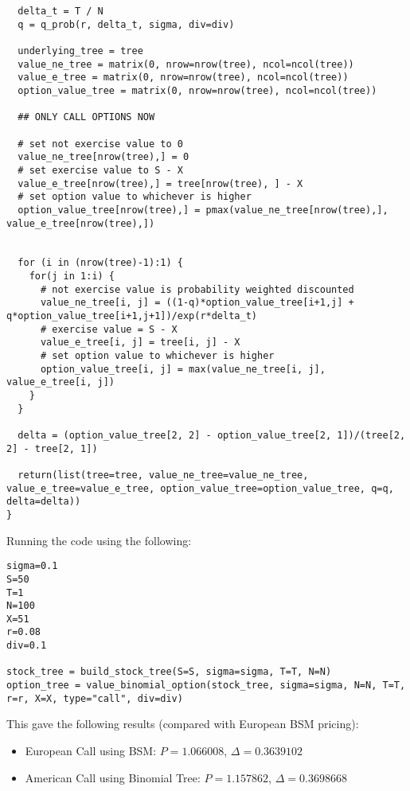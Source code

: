 \documentclass[11pt]{scrartcl}
\begin{document}
\begin{lstlisting}
  delta_t = T / N
  q = q_prob(r, delta_t, sigma, div=div)
  
  underlying_tree = tree
  value_ne_tree = matrix(0, nrow=nrow(tree), ncol=ncol(tree))
  value_e_tree = matrix(0, nrow=nrow(tree), ncol=ncol(tree))
  option_value_tree = matrix(0, nrow=nrow(tree), ncol=ncol(tree))
  
  ## ONLY CALL OPTIONS NOW
  
  # set not exercise value to 0
  value_ne_tree[nrow(tree),] = 0
  # set exercise value to S - X
  value_e_tree[nrow(tree),] = tree[nrow(tree), ] - X
  # set option value to whichever is higher
  option_value_tree[nrow(tree),] = pmax(value_ne_tree[nrow(tree),], value_e_tree[nrow(tree),])
  
  
  for (i in (nrow(tree)-1):1) {
    for(j in 1:i) {
      # not exercise value is probability weighted discounted
      value_ne_tree[i, j] = ((1-q)*option_value_tree[i+1,j] + q*option_value_tree[i+1,j+1])/exp(r*delta_t)
      # exercise value = S - X
      value_e_tree[i, j] = tree[i, j] - X
      # set option value to whichever is higher
      option_value_tree[i, j] = max(value_ne_tree[i, j], value_e_tree[i, j])
    }
  }
  
  delta = (option_value_tree[2, 2] - option_value_tree[2, 1])/(tree[2, 2] - tree[2, 1])
    
  return(list(tree=tree, value_ne_tree=value_ne_tree, value_e_tree=value_e_tree, option_value_tree=option_value_tree, q=q, delta=delta))
}
\end{lstlisting}

Running the code using the following:

\begin{lstlisting}
sigma=0.1
S=50
T=1
N=100
X=51
r=0.08
div=0.1

stock_tree = build_stock_tree(S=S, sigma=sigma, T=T, N=N)
option_tree = value_binomial_option(stock_tree, sigma=sigma, N=N, T=T, r=r, X=X, type="call", div=div)
\end{lstlisting}

This gave the following results (compared with European BSM pricing):

\begin{itemize}
\item European Call using BSM: $P = 1.066008$, $\Delta = 0.3639102$
\item American Call using Binomial Tree: $P = 1.157862$, $\Delta = 0.3698668$
\end{itemize}
\end{document}
